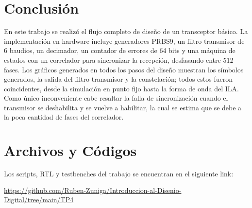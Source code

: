\section{Conclusión}

En este trabajo se realizó el flujo completo de diseño de un transceptor básico. La implementación en hardware incluye generadores PRBS9, un filtro transmisor de 6 baudios, un decimador, un contador de errores de 64 bits y una máquina de estados con un correlador para sincronizar la recepción, desfasando entre 512 fases. Los gráficos generados en todos los pasos del diseño muestran los símbolos generados, la salida del filtro transmisor y la constelación; todos estos fueron coincidentes, desde la simulación en punto fijo hasta la forma de onda del ILA. Como único inconveniente cabe resaltar la falla de sincronización cuando el transmisor se deshabilita y se vuelve a habilitar, la cual se estima que se debe a la poca cantidad de fases del correlador.

\appendix

\section{Archivos y Códigos} \label{appx:archivos}

Los scripts, RTL y testbenches del trabajo se encuentran en el siguiente link:

\noindent
\url{https://github.com/Ruben-Zuniga/Introduccion-al-Disenio-Digital/tree/main/TP4}


%
%


